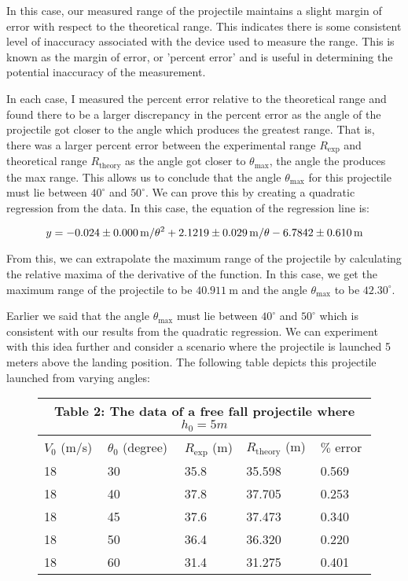 \documentclass[12pt]{article}
\begin{document}
In this case, our measured range of the projectile maintains a slight margin of error with respect to the theoretical range. This indicates there is some consistent level of inaccuracy associated with the device used to measure the range. This is known as the margin of error, or 'percent error' and is useful in determining the potential inaccuracy of the measurement.

In each case, I measured the percent error relative to the theoretical range and found there to be a larger discrepancy in the percent error as the angle of the projectile got closer to the angle which produces the greatest range. That is, there was a larger percent error between the experimental range $R_\text{exp}$ and theoretical range $R_\text{theory}$ as the angle got closer to $\theta_\text{max}$, the angle the produces the max range. This allows us to conclude that the angle $\theta_\text{max}$ for this projectile must lie between $40^\circ$ and $50^\circ$. We can prove this by creating a quadratic regression from the data. In this case, the equation of the regression line is:

\[ y=-0.024 \pm \SI{0.000}{\metre\per\theta\squared}+2.1219 \pm \SI{0.029}{\metre\per\theta}-6.7842\pm \SI{0.610}{\metre}\]

From this, we can extrapolate the maximum range of the projectile by calculating the relative maxima of the derivative of the function. In this case, we get the maximum range of the projectile to be $\SI{40.911}{\metre}$ and the angle $\theta_\text{max}$ to be $42.30^\circ$.

Earlier we said that the angle $\theta_\text{max}$ must lie between $40^\circ$ and $50^\circ$ which is consistent with our results from the quadratic regression. We can experiment with this idea further and consider a scenario where the projectile is launched 5 meters above the landing position. The following table depicts this projectile launched from varying angles:

\begin{figure}[H]
    \centering
    \begin{tabular}{ p{2cm}p{2cm}p{2cm}p{2cm}p{2cm} }
        \hline
        \multicolumn{5}{c}{Table 2: The data of a free fall projectile where $h_0=5m$} \\
        \hline
        $V_0$ (m/s) & $\theta_0$ (degree) & $R_\text{exp}$ (m) & $R_\text{theory}$ (m) & $\%$ error \\
        \hline
        18 & 30 & 35.8 & 35.598 & 0.569 \\
        18 & 40 & 37.8 & 37.705 & 0.253 \\
        18 & 45 & 37.6 & 37.473 & 0.340 \\
        18 & 50 & 36.4 & 36.320 & 0.220 \\
        18 & 60 & 31.4 & 31.275 & 0.401 \\
        \hline
    \end{tabular}
\end{figure}
\end{document}
